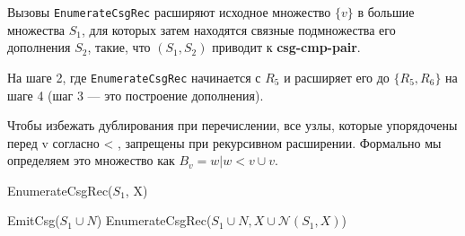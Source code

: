 \documentclass[12pt]{article}
\begin{document}
\begin{flushleft}
Вызовы \texttt{EnumerateCsgRec} расширяют исходное множество $\{v\}$  
в большие множества $S_1$, для которых затем находятся связные подмножества  
его дополнения $S_2$, такие, что $(S_1, S_2)$ приводит к \textbf{csg-cmp-pair}.  

На шаге 2, где \texttt{EnumerateCsgRec} начинается с $R_5$  
и расширяет его до $\{R_5, R_6\}$ на шаге 4  
(шаг 3 — это построение дополнения).

\begin{center}
\end{center}

Чтобы избежать дублирования при перечислении, все узлы, которые 
упорядочены перед v согласно < , запрещены при рекурсивном 
расширении. Формально мы определяем это множество как $B_v={w | w < v} \cup {v}$.

\begin{algorithm}
    EnumerateCsgRec($S_1$, X)
    \begin{algorithmic}[1]
                \State EmitCsg($S_1 \cup N$)
            \EndIf
        \EndFor
            \State EnumerateCsgRec($S_1 \cup N,X \cup \mathcal{N}(S_1, X)$)
        \EndFor
    \end{algorithmic}
\end{algorithm}


\end{flushleft}
\end{document}
